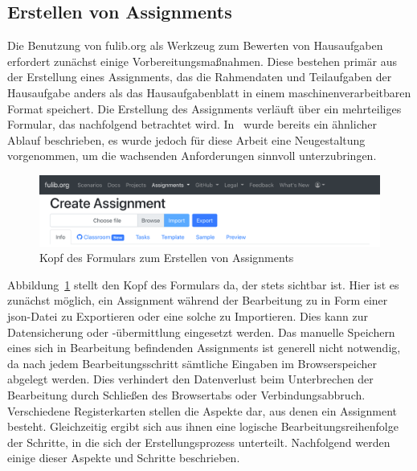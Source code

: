 \subsection{Erstellen von Assignments}\label{subsec:creating-assignments}

Die Benutzung von fulib.org als Werkzeug zum Bewerten von Hausaufgaben erfordert zunächst einige Vorbereitungsmaßnahmen.
Diese bestehen primär aus der Erstellung eines Assignments, das die Rahmendaten und Teilaufgaben der Hausaufgabe anders als das Hausaufgabenblatt in einem maschinenverarbeitbaren Format speichert.
Die Erstellung des Assignments verläuft über ein mehrteiliges Formular, das nachfolgend betrachtet wird.
In~\cite{bachelor-thesis} wurde bereits ein ähnlicher Ablauf beschrieben, es wurde jedoch für diese Arbeit eine Neugestaltung vorgenommen, um die wachsenden Anforderungen sinnvoll unterzubringen.

\begin{figure}
    \centering
    \includegraphics[width=\textwidth]{images/assignment-create-head}
    \caption{Kopf des Formulars zum Erstellen von Assignments}
    \label{fig:assignment-create-head}
\end{figure}

Abbildung~\ref{fig:assignment-create-head} stellt den Kopf des Formulars da, der stets sichtbar ist.
Hier ist es zunächst möglich, ein Assignment während der Bearbeitung zu in Form einer \ac{json}-Datei zu Exportieren oder eine solche zu Importieren.
Dies kann zur Datensicherung oder -übermittlung eingesetzt werden.
Das manuelle Speichern eines sich in Bearbeitung befindenden Assignments ist generell nicht notwendig, da nach jedem Bearbeitungsschritt sämtliche Eingaben im Browserspeicher abgelegt werden.
Dies verhindert den Datenverlust beim Unterbrechen der Bearbeitung durch Schließen des Browsertabs oder Verbindungsabbruch.
Verschiedene Registerkarten stellen die Aspekte dar, aus denen ein Assignment besteht.
Gleichzeitig ergibt sich aus ihnen eine logische Bearbeitungsreihenfolge der Schritte, in die sich der Erstellungsprozess unterteilt.
Nachfolgend werden einige dieser Aspekte und Schritte beschrieben.

